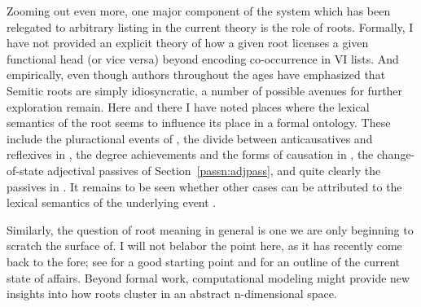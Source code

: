 \begin{exe}
\begin{xlist}
\begin{xlist}
\begin{xlist}
\begin{xlist}
\begin{xlist}
\begin{xlist}
\begin{exe}
\begin{xlist}
\begin{exe}
\begin{exe}
\begin{xlist}
\begin{exe}
\begin{exe}
\begin{xlist}
\begin{exe}
\begin{xlist}
\begin{exe}
\begin{xlist}
\begin{exe}
\begin{xlist}
\begin{exe}
\begin{xlist}
\begin{exe}
\begin{xlist}
\begin{exe}
\begin{xlist}
\begin{exe}
\begin{xlist}
\begin{exe}
\begin{xlist}
\begin{exe}
\begin{xlist}
\begin{exe}
\begin{xlist}
\label{r1:6:4}Zooming out even more, one major component of the system which has been relegated to arbitrary listing in the current theory is the role of roots. Formally, I have not provided an explicit theory of how a given root licenses a given functional head (or vice versa) beyond encoding co-occurrence in VI lists. And empirically, even though authors throughout the ages have emphasized that Semitic roots are simply idiosyncratic, a number of possible avenues for further exploration remain. Here and there I have noted places where the lexical semantics of the root seems to influence its place in a formal ontology. These include the pluractional events of {\tpie}, the divide between anticausatives and reflexives in {\thit}, the degree achievements and the forms of causation in {\thif}, the change-of-state adjectival passives of Section~\ref{passn:adjpass}, and quite clearly the passives in {\tnif}. It remains to be seen whether other cases can be attributed to the lexical semantics of the underlying event  \citep[114]{kastner16phd}.

Similarly, the question of root meaning in general is one we are only beginning to scratch the surface of. I will not belabor the point here, as it has recently come back to the fore; see \cite{harley14thlia} for a good starting point and \cite{kastnertucker19cup} for an outline of the current state of affairs.
Beyond formal work, computational modeling might provide new insights into how roots cluster in an abstract n-dimensional space.


\end{xlist}
\end{exe}
\end{xlist}
\end{exe}
\end{xlist}
\end{exe}
\end{xlist}
\end{exe}
\end{xlist}
\end{exe}
\end{xlist}
\end{exe}
\end{xlist}
\end{exe}
\end{xlist}
\end{exe}
\end{xlist}
\end{exe}
\end{xlist}
\end{exe}
\end{xlist}
\end{exe}
\end{exe}
\end{xlist}
\end{exe}
\end{exe}
\end{xlist}
\end{exe}
\end{xlist}
\end{xlist}
\end{xlist}
\end{xlist}
\end{xlist}
\end{xlist}
\end{exe}
